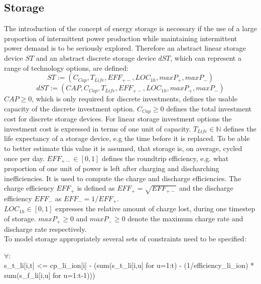 \documentclass[
	11pt,								%
	DIV10,								%
	a4paper,         					%
	oneside,							%
	headheight=20pt,					%
	footheight=20pt,					%
    parskip=full,						%
    listof=totoc,						%
	bibliography=totoc,					%
	index=totoc,						%
]{scrartcl}
\begin{document}
\subsection{Storage}
The introduction of the concept of energy storage is necessary if the use of a large proportion of intermittent power production while maintaining intermittent power demand is to be seriously explored.
Therefore an abstract linear storage device $ST$ and an abstract discrete storage device $dST$, which can represent a range of technology options, are defined:\\
	\begin{equation}
		ST := (C_{Cap}, T_{Life}, EFF_{+-}, LOC_{1h}, maxP_{+}, maxP_{-})
	\end{equation}
	\begin{equation}
		dST := (CAP, C_{Cap}, T_{Life}, EFF_{+-}, LOC_{1h}, maxP_{+}, maxP_{-})
	\end{equation}
	$CAP \geq 0$, which is only required for discrete investments, defines the usable capacity of the discrete investment option.
	$C_{Cap} \geq 0$ defines the total investment cost for discrete storage devices. For linear storage investment options the investment cost is expressed in terms of one unit of capacity.
	$T_{Life} \in \mathbb{N}$ defines the life expectancy of a storage device, e.g the time before it is replaced. To be able to better estimate this value it is assumed, that storage is, on average, cycled once per day.
	$EFF_{+-} \in [0,1]$ defines the roundtrip efficiency, e.g. what proportion of one unit of power is left after charging and discharching inefficiencies. It is used to compute the charge and discharge efficiencies.
	The charge efficiency $EFF_{+}$ is defined as $EFF_{+} = \sqrt{EFF_{+-}}$ and the discharge efficiency $EFF_{-}$ as $EFF_{-} = 1/EFF_{+}$.\cite{LAUINGER201624}\\
	$LOC_{1h} \in [0,1]$ expresses the relative amount of charge lost, during one timestep of storage.
	$maxP_{+} \geq 0$ and $maxP_{-} \geq 0$ denote the maximum charge rate and discharge rate respectively.
	\\
	To model storage appropriately several sets of constraints need to be specified:
	
	$\forall $:
	\begin{equation}
		
	\end{equation}
s_t_li[i,t] <=  cp_li_ion[i] - (sum(s_t_li[i,u] for u=1:t) - (1/efficiency_li_ion) * sum(s_f_li[i,u] for u=1:t-1)))
\end{document}
